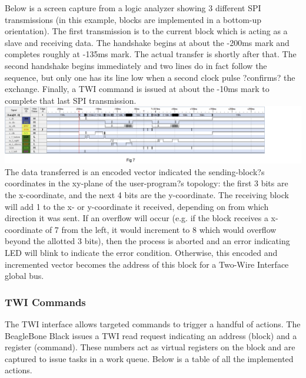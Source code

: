 \documentclass[12pt,a4paper]{article}
\begin{document}
 
 Below is a screen capture from a logic analyzer showing 3 different SPI transmissions (in this example, blocks are implemented in a bottom-up orientation). The first transmission is to the current block which is acting as a slave and receiving data. The handshake begins at about the -200ms mark and completes roughly at -135ms mark. The actual transfer is shortly after that. The second handshake begins immediately and two lines do in fact follow the sequence, but only one has its line low when a second clock pulse ?confirms? the exchange. Finally, a TWI command is issued at about the -10ms mark to complete that last SPI transmission.\\
 
 \includegraphics[width=7in]{RCC.png}
  The data transferred is an encoded vector indicated the sending-block?s coordinates in the xy-plane of the user-program?s topology: the first 3 bits are the x-coordinate, and the next 4 bits are the y-coordinate. The receiving block will add 1 to the x- or y-coordinate it received, depending on from which direction it was sent. If an overflow will occur (e.g. if the block receives a x-coordinate of 7 from the left, it would increment to 8 which would overflow beyond the allotted 3 bits), then the process is aborted and an error indicating LED will blink to indicate the error condition. Otherwise, this encoded and incremented vector becomes the address of this block for a Two-Wire Interface global bus.
  
  \subsubsection{TWI Commands}
  The TWI interface allows targeted commands to trigger a handful of actions. The BeagleBone Black issues a TWI read request indicating an address (block) and a register (command). These numbers act as virtual registers on the block and are captured to issue tasks in a work queue. Below is a table of all the implemented actions. 
  
\end{document}
